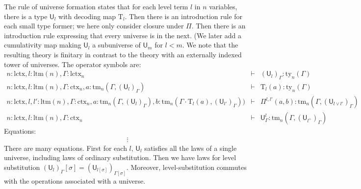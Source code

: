 \documentclass[11pt,a4paper]{article}
\theoremstyle{definition}
\newcommand{\UU}{\mathsf{U}}
\def\UU{\mathsf{U}}
\newcommand{\N}{\mathsf{N}}
\def\Pihat{\Pi}
\def\lctx{\mathrm{lctx}}
\def\ltm{\mathrm{ltm}}
\newcommand{\ctx}{\mathrm{ctx}}
\newcommand{\ty}{\mathrm{ty}}
\newcommand{\tm}{\mathrm{tm}}
\def\U{\mathsf{U}}
\newcommand{\Ta}{\mathrm{T}}
\begin{document}
The rule of universe formation states that for each level term $l$ in $n$ variables, there is a type $\UU_l$ with decoding map $\Ta_l$. Then there is an introduction rule for each small type former; we here only consider closure under $\Pi$. Then there is an introduction rule expressing that every universe is in the next. (We later add  a cumulativity map making $\U_l$ a subuniverse of $\UU_m$ for $l < m$. We note that the resulting theory is finitary in contrast to the theory with an externally indexed tower of universes.
The operator symbols are:
\begin{eqnarray*}
n : \lctx, l : \ltm(n), \Gamma : \lctx_n &\vdash& (\U_{l})_\Gamma : \ty_n(\Gamma)\\
n : \lctx, l : \ltm(n), \Gamma : \ctx_n, a : \tm_n(\Gamma,(\U_{l})_\Gamma) &\vdash& {\Ta_{l}}(a) : \ty_n(\Gamma)\\
n : \lctx, l, l' : \ltm(n), \Gamma : \ctx_n,
a : \tm_n(\Gamma,(\U_{l})_\Gamma),
b :  \tm_n(\Gamma \cdot \Ta_{l}(a), (\U_{l'})_\Gamma))
&\vdash&
 \Pihat^{l,l'}(a,b) : \tm_n(\Gamma,(\U_{l \vee l'})_\Gamma)\\
 n : \lctx, l : \ltm(n),\Gamma : \ctx_n&\vdash&\UU^l_\Gamma: \tm_n(\Gamma,(\UU_{l^+})_\Gamma)
\end{eqnarray*}
Equations:
\begin{eqnarray*}
&\vdots&
\end{eqnarray*}
There are many equations. First for each $l$, $\U_l$ satisfies all the laws of a single universe, including laws of ordinary substitution. Then we have laws for level substitution $(\U_{l})_\Gamma[\sigma] = (\U_{l[\sigma]})_{\Gamma[\sigma]}$. Moreover, level-substitution commutes with the operations associated with a universe.


\end{document}
